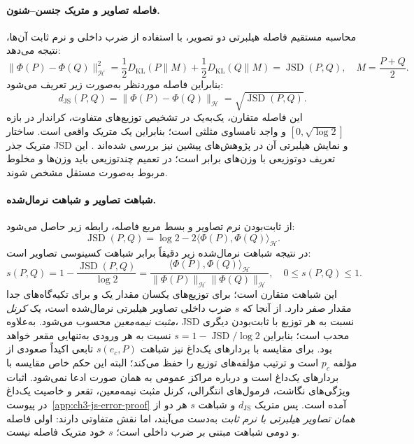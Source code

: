 \paragraph{فاصله تصاویر و متریک جنسن--شنون.}
محاسبه مستقیم فاصله هیلبرتی دو تصویر، با استفاده از ضرب داخلی و نرم ثابت آن‌ها، نتیجه می‌دهد:
\begin{equation}\label{eq:ch3-js-Hilbert-metric}
\boxed{
\|\Phi(P)-\Phi(Q)\|_{\mathcal H}^2
=\frac12D_{\mathrm{KL}}(P\|M)
+\frac12D_{\mathrm{KL}}(Q\|M)
=\operatorname{JSD}(P,Q),
\quad M=\frac{P+Q}{2}.
}
\end{equation}
بنابراین فاصله موردنظر به‌صورت زیر تعریف می‌شود:
\begin{equation}\label{eq:ch3-js-distance}
\boxed{
d_{\mathrm{JS}}(P,Q)
=\|\Phi(P)-\Phi(Q)\|_{\mathcal H}
=\sqrt{\operatorname{JSD}(P,Q)}.
}
\end{equation}
این فاصله متقارن، یک‌به‌یک در تشخیص توزیع‌های متفاوت، کراندار در بازه $[0,\sqrt{\log2}]$ و واجد نامساوی مثلثی است؛ بنابراین یک متریک واقعی است. ساختار متریک جذر JSD و نمایش هیلبرتی آن در پژوهش‌های پیشین نیز بررسی شده‌اند \cite{EndresSchindelin2003,FugledeTopsoe2004}. این تعریف دوتوزیعی با وزن‌های برابر است؛
در تعمیم چندتوزیعی باید وزن‌ها و مخلوط مربوط
به‌صورت مستقل مشخص شوند.

\paragraph{شباهت تصاویر و شباهت نرمال‌شده.}
از ثابت‌بودن نرم تصاویر و بسط مربع فاصله، رابطه زیر حاصل می‌شود:
\begin{equation}\label{eq:ch3-js-Hilbert-cosine}
\operatorname{JSD}(P,Q)
=\log2-2\langle\Phi(P),\Phi(Q)\rangle_{\mathcal H}.
\end{equation}
در نتیجه شباهت نرمال‌شده زیر دقیقاً برابر شباهت کسینوسی تصاویر است:
\begin{equation}\label{eq:ch3-js-similarity}
\boxed{
s(P,Q)=1-\frac{\operatorname{JSD}(P,Q)}{\log2}
=\frac{\langle\Phi(P),\Phi(Q)\rangle_{\mathcal H}}
{\|\Phi(P)\|_{\mathcal H}\|\Phi(Q)\|_{\mathcal H}},
\quad 0\le s(P,Q)\le1.
}
\end{equation}
این شباهت متقارن است؛ برای توزیع‌های یکسان مقدار یک
و برای تکیه‌گاه‌های جدا مقدار صفر دارد.
از آنجا که $s$ ضرب داخلی تصاویر هیلبرتی
نرمال‌شده است، یک \emph{کرنل مثبت نیمه‌معین}
محسوب می‌شود. به‌علاوه، JSD نسبت به هر توزیع
با ثابت‌بودن دیگری محدب است؛ بنابراین
$s=1-\operatorname{JSD}/\log2$
نسبت به هر ورودی به‌تنهایی مقعر خواهد بود.
برای مقایسه با بردارهای یک‌داغ نیز
شباهت $s(e_c,P)$ تابعی اکیداً صعودی
از مؤلفه $p_c$ است و ترتیب مؤلفه‌های
توزیع را حفظ می‌کند؛ البته این حکم خاص
مقایسه با بردارهای یک‌داغ است و درباره
مراکز عمومی به همان صورت ادعا نمی‌شود.
اثبات ویژگی‌های نگاشت، فرمول‌های انتگرالی،
کرنل مثبت نیمه‌معین، تقعر و خاصیت یک‌داغ
در پیوست~\ref{app:ch3-js-error-proof} آمده است.
پس متریک $d_{\mathrm{JS}}$ و شباهت $s$
هر دو از \emph{همان تصاویر هیلبرتی با نرم ثابت}
به‌دست می‌آیند، اما نقش متفاوتی دارند:
اولی فاصله و دومی شباهت مبتنی بر ضرب داخلی است؛
$s$ خود متریک فاصله نیست.

